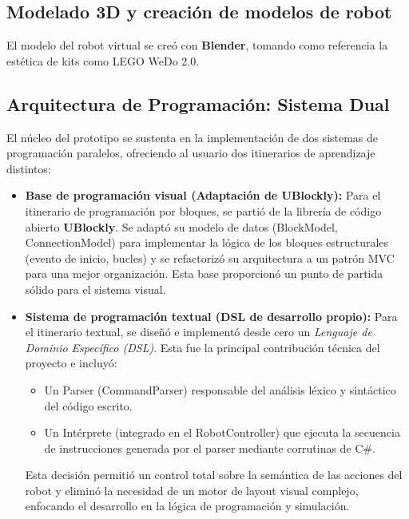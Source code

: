 \subsection{Modelado 3D y creación de modelos de robot}
El modelo del robot virtual se creó con \textbf{Blender}, tomando como referencia la estética de kits como LEGO WeDo 2.0.

\subsection{Arquitectura de Programación: Sistema Dual}

El núcleo del prototipo se sustenta en la implementación de dos sistemas de programación paralelos, ofreciendo al usuario dos itinerarios de aprendizaje distintos:

\begin{itemize}
	\item \textbf{Base de programación visual (Adaptación de UBlockly):}
	Para el itinerario de programación por bloques, se partió de la librería de código abierto \textbf{UBlockly}. Se adaptó su modelo de datos (BlockModel, ConnectionModel) para implementar la lógica de los bloques estructurales (evento de inicio, bucles) y se refactorizó su arquitectura a un patrón MVC para una mejor organización. Esta base proporcionó un punto de partida sólido para el sistema visual.
	
	\item \textbf{Sistema de programación textual (DSL de desarrollo propio):}
	Para el itinerario textual, se diseñó e implementó desde cero un \textit{Lenguaje de Dominio Específico (DSL)}. Esta fue la principal contribución técnica del proyecto e incluyó:
	\begin{itemize}
		\item Un Parser (CommandParser) responsable del análisis léxico y sintáctico del código escrito.
		\item Un Intérprete (integrado en el RobotController) que ejecuta la secuencia de instrucciones generada por el parser mediante corrutinas de C\#.
	\end{itemize}
	Esta decisión permitió un control total sobre la semántica de las acciones del robot y eliminó la necesidad de un motor de layout visual complejo, enfocando el desarrollo en la lógica de programación y simulación.
\end{itemize}
